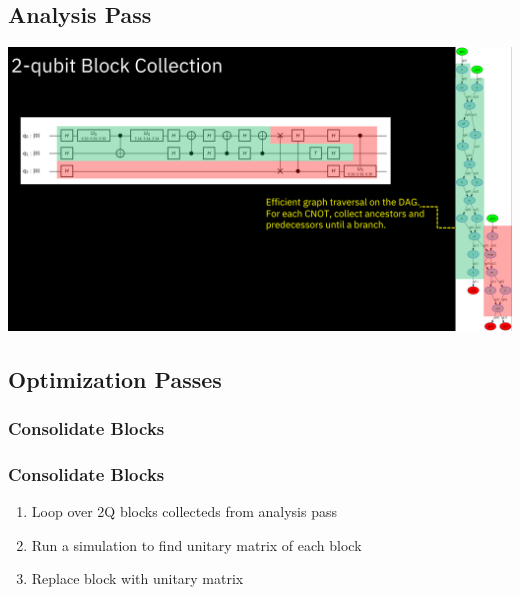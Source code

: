 \documentclass[aspectratio=169,11pt,hyperref={colorlinks=true}]{beamer}
\begin{document}
\subsection{Analysis Pass}
{
\begin{frame}
    \includegraphics[width=\textwidth]{block_collection.png}
\end{frame}
}

\subsection{Optimization Passes}
\subsubsection{Consolidate Blocks}
\begin{frame}
    \frametitle{Consolidate Blocks}
    \begin{enumerate}
        \item Loop over 2Q blocks collecteds from analysis pass
        \item Run a simulation to find unitary matrix of each block
        \item Replace block with unitary matrix
    \end{enumerate}
    \begin{center}
    \vspace{3em}
\end{center}
\end{frame}
\end{document}
